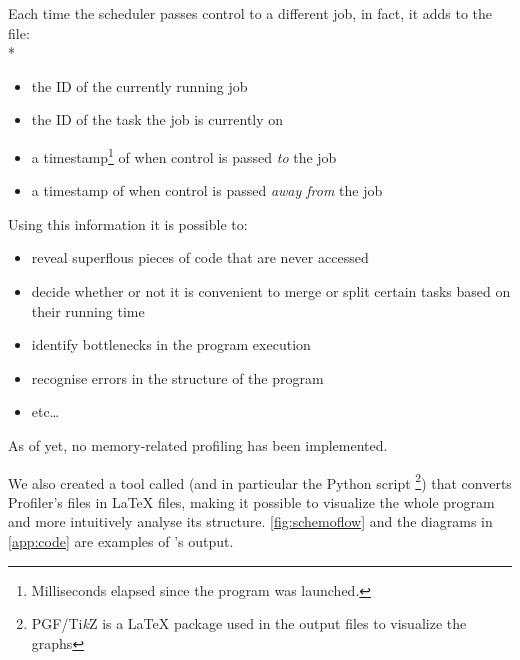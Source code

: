  \beforelist Each time the scheduler passes control to a different job, in fact, it
  adds to the file:\\*
  \begin{itemize}
    \item the ID of the currently running job
    \item the ID of the task the job is currently on
    \item a timestamp\footnote{\label{clock_note}Milliseconds elapsed
    since the program was launched.} of when control is passed
    \textit{to} the job
    \item a timestamp of when control is passed
    \textit{away from} the job
  \end{itemize}
  \afterlist
  \beforelist Using this information it is possible to:
  \begin{itemize}
    \item reveal superflous pieces of code that are never accessed
    \item decide whether or not it is convenient to merge or split
    certain tasks based on their running time
    \item identify bottlenecks in the program execution
    \item recognise errors in the structure of the program
    \item etc\ldots
  \end{itemize}
  \afterlist
  As of yet, no memory-related profiling has been implemented.

  We also created a tool called \ScheMoTeX{} (and in particular the
  Python script \footnote{PGF/Ti\textit{k}Z is a
  \LaTeX{} package used in the output files to visualize the graphs})
  that converts \ScheMo{} Profiler's  files in \LaTeX{}
   files, making it possible to visualize the whole program
  and more intuitively analyse its structure. \autoref{fig:schemoflow}
  and the diagrams in \autoref{app:code} are examples of
  \ScheMoTeX{}'s output.
